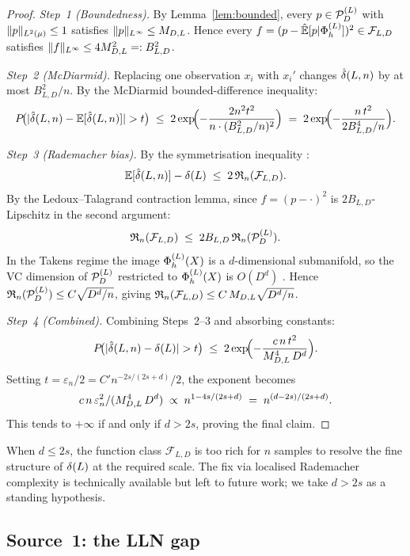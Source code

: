 \begin{proof}
\emph{Step~1 (Boundedness).}
By Lemma~\ref{lem:bounded}, every $p \in \mathcal{P}_D^{(L)}$ with $\|p\|_{L^{2}(\mu)} \leq 1$
satisfies $\|p\|_{L^{\infty}} \leq M_{D,L}$.
Hence every $f = (p - \hat{\mathbb{E}}[p|\Phi_h^{(L)}])^2 \in \mathcal{F}_{L,D}$ satisfies
$\|f\|_{L^{\infty}} \leq 4M_{D,L}^2 =: B_{L,D}^2$.

\emph{Step~2 (McDiarmid).}
Replacing one observation $x_i$ with $x_i'$ changes
$\hat{\delta}(L,n)$ by at most $B_{L,D}^2/n$.
By the McDiarmid bounded-difference inequality:
\[
  P\!\bigl(|\hat{\delta}(L,n) - \mathbb{E}[\hat{\delta}(L,n)]| > t\bigr)
  \;\leq\; 2\exp\!\Bigl(-\frac{2n^2 t^2}{n \cdot (B_{L,D}^2/n)^2}\Bigr)
  \;=\; 2\exp\!\Bigl(-\frac{n\,t^2}{2B_{L,D}^4/n}\Bigr).
\]

\emph{Step~3 (Rademacher bias).}
By the symmetrisation inequality \cite{BartlettMendelson2002}:
\[
  \mathbb{E}[\hat{\delta}(L,n)] - \delta(L)
  \;\leq\; 2\,\mathfrak{R}_n(\mathcal{F}_{L,D}).
\]
By the Ledoux--Talagrand contraction lemma, since $f = (p - \cdot)^2$ is
$2B_{L,D}$-Lipschitz in the second argument:
\[
  \mathfrak{R}_n(\mathcal{F}_{L,D})
  \;\leq\; 2B_{L,D}\,\mathfrak{R}_n(\mathcal{P}_D^{(L)}).
\]
In the Takens regime the image $\Phi_h^{(L)}(X)$ is a $d$-dimensional submanifold,
so the VC dimension of $\mathcal{P}_D^{(L)}$ restricted to $\Phi_h^{(L)}(X)$ is
$O(D^d)$ \cite{Gyorfi2002}.
Hence $\mathfrak{R}_n(\mathcal{P}_D^{(L)}) \leq C\sqrt{D^d/n}$, giving
$\mathfrak{R}_n(\mathcal{F}_{L,D}) \leq C\,M_{D,L}\sqrt{D^d/n}$.

\emph{Step~4 (Combined).}
Combining Steps~2--3 and absorbing constants:
\[
  P\!\bigl(|\hat{\delta}(L,n) - \delta(L)| > t\bigr)
  \;\leq\; 2\exp\!\Bigl(-\frac{c\,n\,t^2}{M_{D,L}^4\,D^d}\Bigr).
\]
Setting $t = \varepsilon_n/2 = C'n^{-2s/(2s+d)}/2$, the exponent becomes
\[
  c\,n\,\varepsilon_n^2 / (M_{D,L}^4\,D^d)
  \;\propto\; n^{1-4s/(2s+d)}
  \;=\; n^{(d-2s)/(2s+d)}.
\]
This tends to $+\infty$ if and only if $d > 2s$,
proving the final claim.
\end{proof}

\begin{remark}
\label{rem:d>2s}
When $d \leq 2s$, the function class $\mathcal{F}_{L,D}$ is too rich for
$n$ samples to resolve the fine structure of $\delta(L)$ at the required scale.
The fix via localised Rademacher complexity \cite{BartlettBousquetMendelson2005}
is technically available but left to future work; we take $d > 2s$ as
a standing hypothesis.
\end{remark}

\subsection{Source~1: the LLN gap}
\label{subsec:source1}


